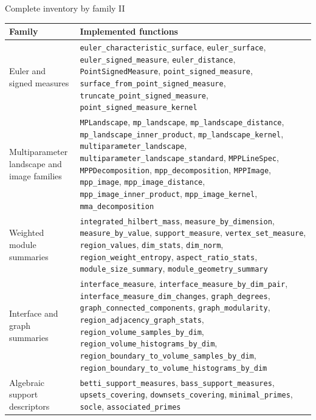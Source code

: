 \documentclass[aspectratio=169,11pt]{beamer}
\begin{document}
\begin{frame}{Complete inventory by family II}
\scriptsize
\begin{tabularx}{\textwidth}{>{\raggedright\arraybackslash}p{3.0cm}X}
\toprule
Family & Implemented functions \\
\midrule
Euler and signed measures & \texttt{euler\_characteristic\_surface}, \texttt{euler\_surface}, \texttt{euler\_signed\_measure}, \texttt{euler\_distance}, \texttt{PointSignedMeasure}, \texttt{point\_signed\_measure}, \texttt{surface\_from\_point\_signed\_measure}, \texttt{truncate\_point\_signed\_measure}, \texttt{point\_signed\_measure\_kernel} \\
Multiparameter landscape and image families & \texttt{MPLandscape}, \texttt{mp\_landscape}, \texttt{mp\_landscape\_distance}, \texttt{mp\_landscape\_inner\_product}, \texttt{mp\_landscape\_kernel}, \texttt{multiparameter\_landscape}, \texttt{multiparameter\_landscape\_standard}, \texttt{MPPLineSpec}, \texttt{MPPDecomposition}, \texttt{mpp\_decomposition}, \texttt{MPPImage}, \texttt{mpp\_image}, \texttt{mpp\_image\_distance}, \texttt{mpp\_image\_inner\_product}, \texttt{mpp\_image\_kernel}, \texttt{mma\_decomposition} \\
Weighted module summaries & \texttt{integrated\_hilbert\_mass}, \texttt{measure\_by\_dimension}, \texttt{measure\_by\_value}, \texttt{support\_measure}, \texttt{vertex\_set\_measure}, \texttt{region\_values}, \texttt{dim\_stats}, \texttt{dim\_norm}, \texttt{region\_weight\_entropy}, \texttt{aspect\_ratio\_stats}, \texttt{module\_size\_summary}, \texttt{module\_geometry\_summary} \\
Interface and graph summaries & \texttt{interface\_measure}, \texttt{interface\_measure\_by\_dim\_pair}, \texttt{interface\_measure\_dim\_changes}, \texttt{graph\_degrees}, \texttt{graph\_connected\_components}, \texttt{graph\_modularity}, \texttt{region\_adjacency\_graph\_stats}, \texttt{region\_volume\_samples\_by\_dim}, \texttt{region\_volume\_histograms\_by\_dim}, \texttt{region\_boundary\_to\_volume\_samples\_by\_dim}, \texttt{region\_boundary\_to\_volume\_histograms\_by\_dim} \\
Algebraic support descriptors & \texttt{betti\_support\_measures}, \texttt{bass\_support\_measures}, \texttt{upsets\_covering}, \texttt{downsets\_covering}, \texttt{minimal\_primes}, \texttt{socle}, \texttt{associated\_primes} \\
\bottomrule
\end{tabularx}
\end{frame}
\end{document}
